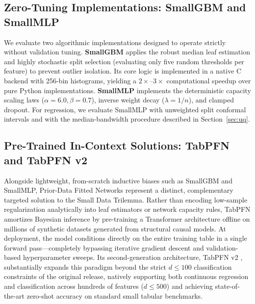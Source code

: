 \documentclass{article}
\begin{document}
\subsection{Zero-Tuning Implementations: SmallGBM and SmallMLP}
We evaluate two algorithmic implementations designed to operate strictly without validation tuning. \textbf{SmallGBM} applies the robust median leaf estimation and highly stochastic split selection (evaluating only five random thresholds per feature) to prevent outlier isolation. Its core logic is implemented in a native C backend with 256-bin histograms, yielding a $2\times$--$3\times$ computational speedup over pure Python implementations. \textbf{SmallMLP} implements the deterministic capacity scaling laws ($\alpha = 6.0, \beta = 0.7$), inverse weight decay ($\lambda = 1/n$), and clamped dropout. For regression, we evaluate SmallMLP with unweighted split conformal intervals and with the median-bandwidth procedure described in Section~\ref{sec:uq}.

\subsection{Pre-Trained In-Context Solutions: TabPFN and TabPFN v2}
\label{sec:tabpfn_targeted}
Alongside lightweight, from-scratch inductive biases such as SmallGBM and SmallMLP, Prior-Data Fitted Networks represent a distinct, complementary targeted solution to the Small Data Trilemma. Rather than encoding low-sample regularization analytically into leaf estimators or network capacity rules, TabPFN \cite{hollmann2022tabpfn, muller2021transformers} amortizes Bayesian inference by pre-training a Transformer architecture offline on millions of synthetic datasets generated from structural causal models. At deployment, the model conditions directly on the entire training table in a single forward pass—completely bypassing iterative gradient descent and validation-based hyperparameter sweeps. Its second-generation architecture, TabPFN v2 \cite{hollmann2025tabpfn}, substantially expands this paradigm beyond the strict $d \le 100$ classification constraints of the original release, natively supporting both continuous regression and classification across hundreds of features ($d \le 500$) and achieving state-of-the-art zero-shot accuracy on standard small tabular benchmarks.
\end{document}
